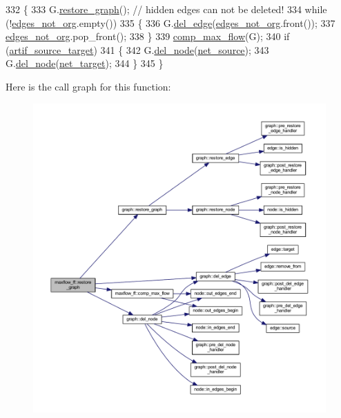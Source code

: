\begin{DoxyCode}
332 \{
333     G.\mbox{\hyperlink{classgraph_a53e2a5505fa6427587e12d66e4a86cec}{restore\_graph}}(); \textcolor{comment}{// hidden edges can not be deleted!}
334     \textcolor{keywordflow}{while} (!\mbox{\hyperlink{classmaxflow__ff_a489798941deb8122a385684c7d416f92}{edges\_not\_org}}.empty())
335     \{
336     G.\mbox{\hyperlink{classgraph_ad9356508c49c542dfd4b7169297387c6}{del\_edge}}(\mbox{\hyperlink{classmaxflow__ff_a489798941deb8122a385684c7d416f92}{edges\_not\_org}}.front());
337     \mbox{\hyperlink{classmaxflow__ff_a489798941deb8122a385684c7d416f92}{edges\_not\_org}}.pop\_front();
338     \}
339     \mbox{\hyperlink{classmaxflow__ff_a560d27c4c62b46dcb0a36ac60ebc1efb}{comp\_max\_flow}}(G);
340     \textcolor{keywordflow}{if} (\mbox{\hyperlink{classmaxflow__ff_a1ec31e7053722875a2e90659f79396a3}{artif\_source\_target}})
341     \{
342     G.\mbox{\hyperlink{classgraph_a8bdc09d5b9ac4bd26586b054d8fcbe91}{del\_node}}(\mbox{\hyperlink{classmaxflow__ff_a2e4cc02ce8c9d929f2896525c686d6c1}{net\_source}});
343     G.\mbox{\hyperlink{classgraph_a8bdc09d5b9ac4bd26586b054d8fcbe91}{del\_node}}(\mbox{\hyperlink{classmaxflow__ff_a94d5db73364cf5824ec3d3d530b57319}{net\_target}});
344     \}
345 \}
\end{DoxyCode}
Here is the call graph for this function\+:\nopagebreak
\begin{figure}[H]
\begin{center}
\leavevmode
\includegraphics[width=350pt]{classmaxflow__ff_a31a13c79918964a49fa18b4eb514c584_cgraph}
\end{center}
\end{figure}
